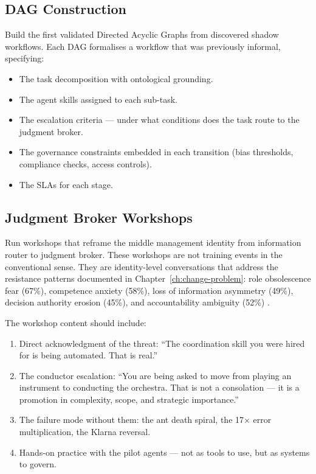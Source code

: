 \subsection{DAG Construction}

Build the first validated Directed Acyclic Graphs from discovered shadow workflows. Each DAG formalises a workflow that was previously informal, specifying:

\begin{itemize}
  \item The task decomposition with ontological grounding.
  \item The agent skills assigned to each sub-task.
  \item The escalation criteria --- under what conditions does the task route to the judgment broker.
  \item The governance constraints embedded in each transition (bias thresholds, compliance checks, access controls).
  \item The SLAs for each stage.
\end{itemize}

\subsection{Judgment Broker Workshops}

Run workshops that reframe the middle management identity from information router to judgment broker. These workshops are not training events in the conventional sense. They are identity-level conversations that address the resistance patterns documented in Chapter~\ref{ch:change-problem}: role obsolescence fear (67\%), competence anxiety (58\%), loss of information asymmetry (49\%), decision authority erosion (45\%), and accountability ambiguity (52\%) \parencite{Capgemini2025}.

The workshop content should include:

\begin{enumerate}
  \item Direct acknowledgment of the threat: ``The coordination skill you were hired for is being automated. That is real.''
  \item The conductor escalation: ``You are being asked to move from playing an instrument to conducting the orchestra. That is not a consolation --- it is a promotion in complexity, scope, and strategic importance.''
  \item The failure mode without them: the ant death spiral, the 17$\times$ error multiplication, the Klarna reversal.
  \item Hands-on practice with the pilot agents --- not as tools to use, but as systems to govern.
\end{enumerate}

